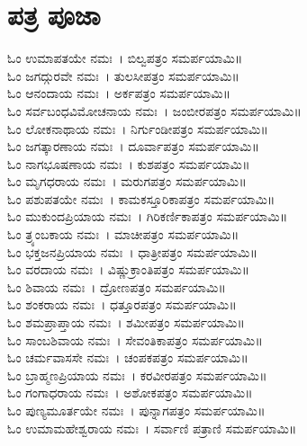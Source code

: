 \section{ಪತ್ರ ಪೂಜಾ }
ಓಂ ಉಮಾಪತಯೇ ನಮಃ~। ಬಿಲ್ವಪತ್ರಂ ಸಮರ್ಪಯಾಮಿ॥\\
ಓಂ ಜಗದ್ಗುರವೇ ನಮಃ~। ತುಲಸೀಪತ್ರಂ ಸಮರ್ಪಯಾಮಿ॥\\
ಓಂ ಆನಂದಾಯ ನಮಃ~। ಅರ್ಕಪತ್ರಂ ಸಮರ್ಪಯಾಮಿ॥\\
ಓಂ ಸರ್ವಬಂಧವಿಮೋಚನಾಯ ನಮಃ~। ಜಂಬೀರಪತ್ರಂ ಸಮರ್ಪಯಾಮಿ॥\\
ಓಂ ಲೋಕನಾಥಾಯ ನಮಃ~। ನಿರ್ಗುಂಡೀಪತ್ರಂ ಸಮರ್ಪಯಾಮಿ॥\\
ಓಂ ಜಗತ್ಕಾರಣಾಯ ನಮಃ~। ದೂರ್ವಾಪತ್ರಂ ಸಮರ್ಪಯಾಮಿ॥\\
ಓಂ ನಾಗಭೂಷಣಾಯ ನಮಃ~। ಕುಶಪತ್ರಂ ಸಮರ್ಪಯಾಮಿ॥\\
ಓಂ ಮೃಗಧರಾಯ ನಮಃ~। ಮರುಗಪತ್ರಂ ಸಮರ್ಪಯಾಮಿ॥\\
ಓಂ ಪಶುಪತಯೇ ನಮಃ~। ಕಾಮಕಸ್ತೂರಿಕಾಪತ್ರಂ ಸಮರ್ಪಯಾಮಿ॥\\
ಓಂ ಮುಕುಂದಪ್ರಿಯಾಯ ನಮಃ~। ಗಿರಿಕರ್ಣಿಕಾಪತ್ರಂ ಸಮರ್ಪಯಾಮಿ॥\\
ಓಂ ತ್ರ್ಯಂಬಕಾಯ ನಮಃ~। ಮಾಚೀಪತ್ರಂ ಸಮರ್ಪಯಾಮಿ॥\\
ಓಂ ಭಕ್ತಜನಪ್ರಿಯಾಯ ನಮಃ~। ಧಾತ್ರೀಪತ್ರಂ ಸಮರ್ಪಯಾಮಿ॥\\
ಓಂ ವರದಾಯ ನಮಃ~। ವಿಷ್ಣುಕ್ರಾಂತಿಪತ್ರಂ ಸಮರ್ಪಯಾಮಿ॥\\
ಓಂ ಶಿವಾಯ ನಮಃ~। ದ್ರೋಣಪತ್ರಂ ಸಮರ್ಪಯಾಮಿ॥\\
ಓಂ ಶಂಕರಾಯ ನಮಃ~। ಧತ್ತೂರಪತ್ರಂ ಸಮರ್ಪಯಾಮಿ॥\\
ಓಂ ಶಮಪ್ರಾಪ್ತಾಯ ನಮಃ~। ಶಮೀಪತ್ರಂ ಸಮರ್ಪಯಾಮಿ॥\\
ಓಂ ಸಾಂಬಶಿವಾಯ ನಮಃ~। ಸೇವಂತಿಕಾಪತ್ರಂ ಸಮರ್ಪಯಾಮಿ॥\\
ಓಂ ಚರ್ಮವಾಸಸೇ ನಮಃ~। ಚಂಪಕಪತ್ರಂ ಸಮರ್ಪಯಾಮಿ॥\\
ಓಂ ಬ್ರಾಹ್ಮಣಪ್ರಿಯಾಯ ನಮಃ~। ಕರವೀರಪತ್ರಂ ಸಮರ್ಪಯಾಮಿ॥\\
ಓಂ ಗಂಗಾಧರಾಯ ನಮಃ~। ಅಶೋಕಪತ್ರಂ ಸಮರ್ಪಯಾಮಿ॥\\
ಓಂ ಪುಣ್ಯಮೂರ್ತಯೇ ನಮಃ~। ಪುನ್ನಾಗಪತ್ರಂ ಸಮರ್ಪಯಾಮಿ॥\\
ಓಂ ಉಮಾಮಹೇಶ್ವರಾಯ ನಮಃ~। ಸರ್ವಾಣಿ ಪತ್ರಾಣಿ ಸಮರ್ಪಯಾಮಿ॥
